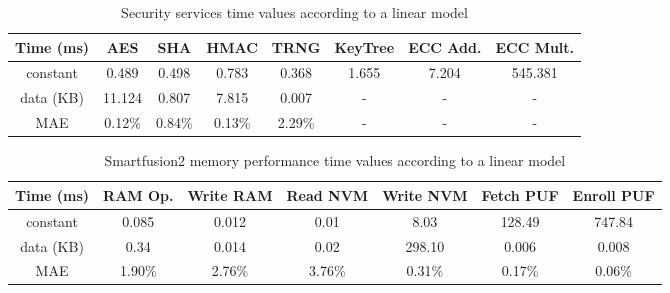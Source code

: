 \begin{table}[h!]
\centering
\def\arraystretch{1.5}
\begin{tabular}{|c|c|c|c|c|c|c|c|}
\hline
Time (ms) & AES    & SHA    & HMAC   & TRNG   & KeyTree & ECC Add. & ECC Mult.   \\ \hline
constant  & 0.489  & 0.498 & 0.783  & 0.368  & 1.655   & 7.204 & 545.381 \\ \hline
data (KB) & 11.124 & 0.807  & 7.815  & 0.007  & -       & -  & - \\ \hline
MAE       & 0.12\% & 0.84\% & 0.13\% & 2.29\% & -       & -  & - \\ \hline
\end{tabular}
\caption{Security services time values according to a linear model}
\label{tab:core-model}
\end{table}

\begin{table}[h!]
\centering
\def\arraystretch{1.5}
\begin{tabular}{|c|c|c|c|c|c|c|}
\hline
Time (ms) & RAM Op. & Write RAM & Read NVM & Write NVM & Fetch PUF & Enroll PUF \\ \hline
constant  & 0.085     & 0.012     & 0.01     & 8.03      & 128.49    & 747.84  \\ \hline
data (KB) & 0.34     & 0.014     & 0.02     & 298.10    & 0.006     & 0.008  \\ \hline
MAE       & 1.90\%    & 2.76\%    & 3.76\%   & 0.31\%    & 0.17\%    & 0.06\%  \\ \hline
\end{tabular}
\caption{Smartfusion2 memory performance time values according to a linear model}
\label{tab:core-model}
\end{table}
